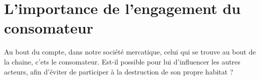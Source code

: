 \section{L'importance de l'engagement du consomateur}

\smallbeak Au bout du compte, dans notre société mercatique, celui qui se trouve au bout de la chaine, c'ets le consomateur.
Est-il possible pour lui d'influencer les autres acteurs, afin d'éviter de participer à la destruction de son propre habitat ?

